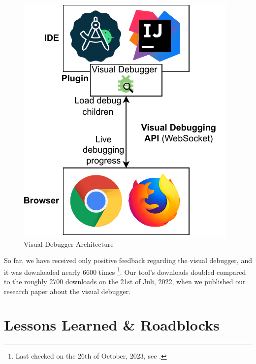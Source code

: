 \documentclass[sigconf]{acmart}
\begin{document}
\begin{figure}[ht]
  \centering
  \includegraphics[width=0.7\linewidth]{images/visual-debugger.pdf}
  \caption{Visual Debugger Architecture}
\end{figure}

So far, we have received only positive feedback regarding the visual debugger, and it was downloaded nearly 6600 times \footnote{Last checked on the 26th of October, 2023, see \cite{timkrauterVisualDebuggerIntelliJ2023}.}.
Our tool's downloads doubled compared to the roughly 2700 downloads on the 21st of Juli, 2022, when we published our research paper \cite{krauterVisualDebuggerTool2022} about the visual debugger.

\section{Lessons Learned \& Roadblocks} \label{sec:lessonsLearned}

\end{document}
